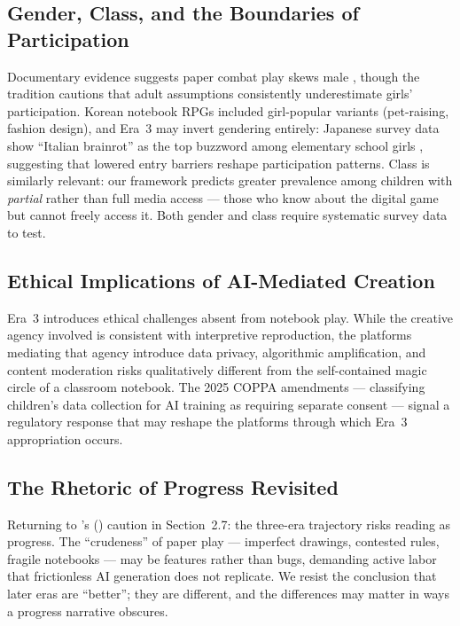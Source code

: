 \documentclass[12pt]{article}
\begin{document}
\subsection{Gender, Class, and the Boundaries of Participation}

Documentary evidence suggests paper combat play skews male \citep{smith2022}, though the \citet{opie1969} tradition cautions that adult assumptions consistently underestimate girls' participation. Korean notebook RPGs included girl-popular variants (pet-raising, fashion design), and Era~3 may invert gendering entirely: Japanese survey data show ``Italian brainrot'' as the top buzzword among elementary school girls \citep{automaton2026}, suggesting that lowered entry barriers reshape participation patterns. Class is similarly relevant: our framework predicts greater prevalence among children with \emph{partial} rather than full media access --- those who know about the digital game but cannot freely access it. Both gender and class require systematic survey data to test.

\subsection{Ethical Implications of AI-Mediated Creation}

Era~3 introduces ethical challenges absent from notebook play. While the creative agency involved is consistent with interpretive reproduction, the platforms mediating that agency introduce data privacy, algorithmic amplification, and content moderation risks qualitatively different from the self-contained magic circle of a classroom notebook. The 2025 COPPA amendments --- classifying children's data collection for AI training as requiring separate consent --- signal a regulatory response that may reshape the platforms through which Era~3 appropriation occurs.

\subsection{The Rhetoric of Progress Revisited}

Returning to \citeauthor{suttonsmith1997}'s (\citeyear{suttonsmith1997}) caution in Section~2.7: the three-era trajectory risks reading as progress. The ``crudeness'' of paper play --- imperfect drawings, contested rules, fragile notebooks --- may be features rather than bugs, demanding active labor that frictionless AI generation does not replicate. We resist the conclusion that later eras are ``better''; they are different, and the differences may matter in ways a progress narrative obscures.
\end{document}
